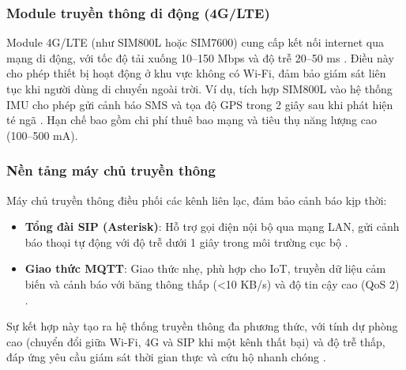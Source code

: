 \subsubsection{Module truyền thông di động (4G/LTE)}
Module 4G/LTE (như SIM800L hoặc SIM7600) cung cấp kết nối internet qua mạng di động, với tốc độ tải xuống 10--150 Mbps và độ trễ 20--50 ms \cite{simcom2023}. Điều này cho phép thiết bị hoạt động ở khu vực không có Wi-Fi, đảm bảo giám sát liên tục khi người dùng di chuyển ngoài trời. Ví dụ, tích hợp SIM800L vào hệ thống IMU cho phép gửi cảnh báo SMS và tọa độ GPS trong 2 giây sau khi phát hiện té ngã \cite{xu2023}. Hạn chế bao gồm chi phí thuê bao mạng và tiêu thụ năng lượng cao (100--500 mA).

\subsubsection{Nền tảng máy chủ truyền thông}
Máy chủ truyền thông điều phối các kênh liên lạc, đảm bảo cảnh báo kịp thời:

\begin{itemize}
    \item \textbf{Tổng đài SIP (Asterisk)}: Hỗ trợ gọi điện nội bộ qua mạng LAN, gửi cảnh báo thoại tự động với độ trễ dưới 1 giây trong môi trường cục bộ \cite{asterisk2023}.
    \item \textbf{Giao thức MQTT}: Giao thức nhẹ, phù hợp cho IoT, truyền dữ liệu cảm biến và cảnh báo với băng thông thấp (<10 KB/s) và độ tin cậy cao (QoS 2) \cite{iotproject2024}.
\end{itemize}

Sự kết hợp này tạo ra hệ thống truyền thông đa phương thức, với tính dự phòng cao (chuyển đổi giữa Wi-Fi, 4G và SIP khi một kênh thất bại) và độ trễ thấp, đáp ứng yêu cầu giám sát thời gian thực và cứu hộ nhanh chóng \cite{multimodal2024}.

